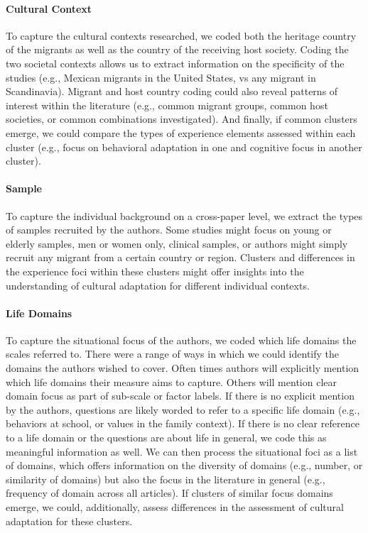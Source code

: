\documentclass[man, 12pt, a4paper]{apa7}
\begin{document}
\paragraph{Cultural Context}
To capture the cultural contexts researched, we coded both the heritage country of the migrants as well as the country of the receiving host society. Coding the two societal contexts allows us to extract information on the specificity of the studies (e.g., Mexican migrants in the United States, vs any migrant in Scandinavia). Migrant and host country coding could also reveal patterns of interest within the literature (e.g., common migrant groups, common host societies, or common combinations investigated). And finally, if common clusters emerge, we could compare the types of experience elements assessed within each cluster (e.g., focus on behavioral adaptation in one and cognitive focus in another cluster). 

\paragraph{Sample}
To capture the individual background on a cross-paper level, we extract the types of samples recruited by the authors. Some studies might focus on young or elderly samples, men or women only, clinical samples, or authors might simply recruit any migrant from a certain country or region. Clusters and differences in the experience foci within these clusters might offer insights into the understanding of cultural adaptation for different individual contexts.

\paragraph{Life Domains}
To capture the situational focus of the authors, we coded which life domains the scales referred to. There were a range of ways in which we could identify the domains the authors wished to cover. Often times authors will explicitly mention which life domains their measure aims to capture. Others will mention clear domain focus as part of sub-scale or factor labels. If there is no explicit mention by the authors, questions are likely worded to refer to a specific life domain (e.g., behaviors at school, or values in the family context). If there is no clear reference to a life domain or the questions are about life in general, we code this as meaningful information as well. We can then process the situational foci as a list of domains, which offers information on the diversity of domains (e.g., number, or similarity of domains) but also the focus in the literature in general (e.g., frequency of domain across all articles). If clusters of similar focus domains emerge, we could, additionally, assess differences in the assessment of cultural adaptation for these clusters.
\end{document}
